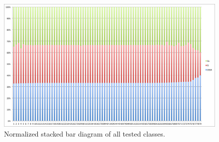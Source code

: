 \documentclass[conference]{IEEEtran}
\begin{document}
\begin{figure}[ht]
\centering
\includegraphics[width=18cm]{StackedBar100PercentMean.png}
\caption{Normalized stacked bar diagram of all tested classes.}
\label{fig:stackedbar}
\end{figure}






%
%

\end{document}
